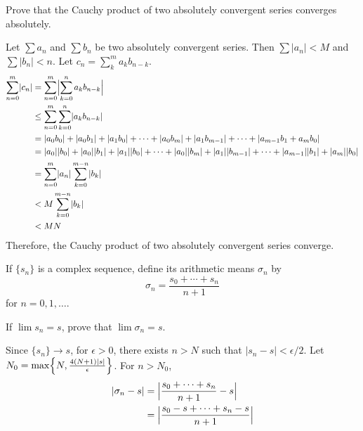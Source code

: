 \begin{exercise}
  Prove that the Cauchy product of two absolutely convergent series converges
  absolutely.
  \par\smallskip
  Let \(\sum a_n\) and \(\sum b_n\) be two absolutely convergent series.
  Then \(\sum\lvert a_n\rvert < M\) and \(\sum\lvert b_n\rvert < n\).
  Let \(c_n = \sum_k^ma_kb_{n - k}\).
  \begin{align*}
    \sum_{n = 0}^m\lvert c_n\rvert
    & = \sum_{n = 0}^m\Bigl\lvert\sum_{k = 0}^n a_kb_{n - k}\Bigr\rvert\\
    & \leq \sum_{n = 0}^m\sum_{k = 0}^n\lvert a_kb_{n - k}\rvert\\
    & = \lvert a_0b_0\rvert + \lvert a_0b_1\rvert + \lvert a_1b_0\rvert +
      \cdots + \lvert a_0b_m\rvert + \lvert a_1b_{m - 1}\rvert + \cdots +
      \lvert a_{m - 1}b_1 + a_mb_0\rvert\\
    & = \lvert a_0\rvert\lvert b_0\rvert + \lvert a_0\rvert\lvert b_1\rvert +
      \lvert a_1\rvert\lvert b_0\rvert + \cdots + \lvert a_0\rvert
      \lvert b_m\rvert + \lvert a_1\rvert\lvert b_{m - 1}\rvert + \cdots +
      \lvert a_{m - 1}\rvert\lvert b_1\rvert + \lvert a_m\rvert
      \lvert b_0\rvert\\
    & = \sum_{n = 0}^m\lvert a_n\rvert\sum_{k = 0}^{m - n}\lvert b_k\rvert\\
    & < M\sum_{k = 0}^{m - n}\lvert b_k\rvert\\
    & < MN
  \end{align*}
  Therefore, the Cauchy product of two absolutely convergent series converge.
\item
  If \(\{s_n\}\) is a complex sequence, define its arithmetic means
  \(\sigma_n\) by
  \[
  \sigma_n = \frac{s_0 + \cdots + s_n}{n + 1}
  \]
  for \(n = 0,1,\ldots\).
  \begin{exercise}[label = (\alph*), ref = \arabic{exercisei} (\alph*)]
  \item
    \label{3.12.a}
    If \(\lim s_n = s\), prove that \(\lim\sigma_n = s\).
    \par\smallskip
    Since \(\{s_n\}\to s\), for \(\epsilon > 0\), there exists \(n > N\) such
    that \(\lvert s_n - s\rvert < \epsilon/2\).
    Let \(N_0 = \max\Bigl\{N,\frac{4(N + 1)\lvert s\rvert}{\epsilon}\Bigr\}\).
    For \(n > N_0\),
    \begin{align*}
      \lvert\sigma_n - s\rvert
      & = \Bigl\lvert\frac{s_0 + \cdots + s_n}{n + 1} - s\Bigr\rvert\\
      & = \Bigl\lvert\frac{s_0 - s + \cdots + s_n - s}{n + 1}\Bigr\rvert\\

\end{align*}
\end{exercise}
\end{exercise}
